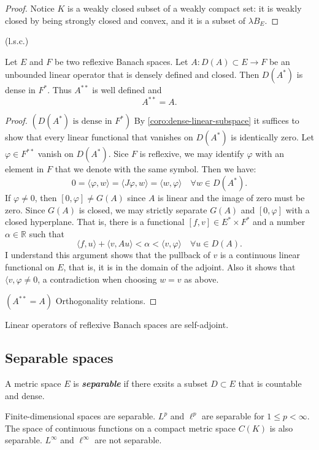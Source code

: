 \documentclass{article}
\theoremstyle{definition}
\numberwithin{equation}{section}
\newcommand{\R}{\mathbb{R}}
\begin{document}
\begin{proof}
	Notice $K$ is a weakly closed subset of a weakly compact set: it is weakly closed by being strongly closed and convex, and it is a subset of $\lambda B_E$.
\end{proof}
\begin{coro}
	(l.s.c.)
\end{coro}
\begin{thm}
	Let $E$ and $F$ be two reflexive Banach spaces. Let $A:D(A)\subset E\to F$ be an unbounded linear operator that is densely defined and closed. Then $D(A^*)$ is dense in $F^*$. Thus $A^{**}$ is well defined and
	\[A^{**}=A.\]
\end{thm}
\begin{proof}
	$(D(A^*)\text{ is dense in }F^*)$ By \cref{coro:dense-linear-subspace} it suffices to show that every linear functional that vanishes on $D(A^*)$ is identically zero. Let $\varphi\in F^{**}$ vanish on $D(A^*)$. Sice $F$ is reflexive, we may identify $\varphi$ with an element in $F$ that we denote with the same symbol. Then we have:
	\[0=\langle \varphi,w\rangle=\langle J\varphi,w\rangle=\langle w,\varphi\rangle\quad\forall w\in D(A^*).\]
	If $\varphi\neq0$, then $[0,\varphi]\neq G(A)$ since $A$ is linear and the image of zero must be zero. {\color{orange} Since $G(A)$ is closed}, we may strictly separate $G(A)$ and $[0,\varphi]$ with a closed hyperplane. That is, there is a functional $[f,v]\in E^*\times F^*$ and a number $\alpha\in \R$ such that
	\[\langle f,u\rangle+\langle v,Au\rangle<\alpha<\langle v,\varphi\rangle\quad\forall u\in D(A).\]
	{\color{orange} I understand this argument shows that the pullback of $v$ is a continuous linear functional on $E$, that is, it is in the domain of the adjoint. Also it shows that $\langle v,\varphi\neq0$, a contradiction when choosing $w=v$ as above.}
	
	$(A^{**}=A)$ {\color{orange} Orthogonality relations.}
\end{proof}
\begin{remark}
	Linear operators of reflexive Banach spaces are self-adjoint.
\end{remark}

	\subsection{Separable spaces}
A metric space $E$ is \textbf{\textit{separable}} if there exsits a subset $D\subset E$ that is countable and dense.

Finite-dimensional spaces are separable. $L^p$ and $\ell^p$ are separable for $1\leq p<\infty$. The space of continuous functions on a compact metric space $C(K)$ is also separable. $L^\infty$ and $\ell^\infty$ are not separable.
\end{document}
